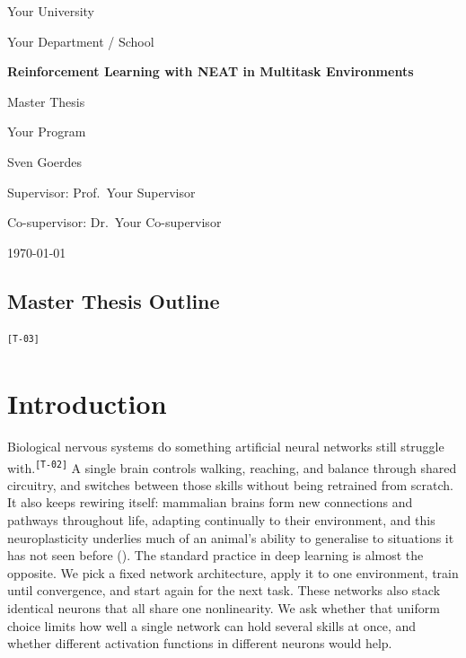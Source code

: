 \documentclass[12pt]{article}
\newcommand{\revID}[1]{\textsuperscript{\scriptsize\texttt{[#1]}}}
\newcommand{\revStructure}[2]{\textcolor{revAmber}{#2}\revID{#1}}
\newcommand{\ThesisTitle}{Reinforcement Learning with NEAT in Multitask Environments}
\newcommand{\ThesisAuthor}{Sven Goerdes}
\newcommand{\ThesisDegree}{Master Thesis}
\newcommand{\ThesisProgram}{Your Program}
\newcommand{\ThesisUniversity}{Your University}
\newcommand{\ThesisDepartment}{Your Department / School}
\newcommand{\ThesisSupervisor}{Supervisor: Prof.\ Your Supervisor}
\newcommand{\ThesisCoSupervisor}{Co-supervisor: Dr.\ Your Co-supervisor}
\newcommand{\ThesisDate}{\today}
\begin{document}
\begin{titlepage}
  \thispagestyle{empty}
  \centering

  {\Large \ThesisUniversity\par}
  {\large \ThesisDepartment\par}
  \vfill

  {\LARGE\bfseries \ThesisTitle\par}
  \vspace{1.5cm}

  {\large \ThesisDegree\par}
  {\large \ThesisProgram\par}
  \vfill

  {\large \ThesisAuthor\par}
  \vspace{0.5cm}
  {\large \ThesisSupervisor\par}
  {\large \ThesisCoSupervisor\par}
  \vfill

  {\large \ThesisDate\par}
\end{titlepage}

\revStructure{T-03}{\section*{Master Thesis Outline}}

\tableofcontents

\bigskip

\newpage

\newpage

\section{Introduction}
\label{sec:introduction}

\revStructure{T-02}{Biological nervous systems do something artificial neural networks still struggle with.}
A single brain controls walking, reaching, and balance through shared circuitry, and switches between those skills without being retrained from scratch.
It also keeps rewiring itself: mammalian brains form new connections and pathways throughout life, adapting continually to their environment, and this neuroplasticity underlies much of an animal's ability to generalise to situations it has not seen before (\cite{pascual-leone_plastic_2005}).
The standard practice in deep learning is almost the opposite.
We pick a fixed network architecture, apply it to one environment, train until convergence, and start again for the next task.
These networks also stack identical neurons that all share one nonlinearity.
We ask whether that uniform choice limits how well a single network can hold several skills at once, and whether different activation functions in different neurons would help.
\end{document}
